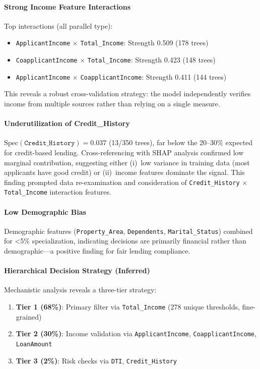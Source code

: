 \paragraph{Strong Income Feature Interactions}
Top interactions (all parallel type):
\begin{itemize}
    \item \texttt{ApplicantIncome} $\times$ \texttt{Total\_Income}: Strength 0.509 (178 trees)
    \item \texttt{CoapplicantIncome} $\times$ \texttt{Total\_Income}: Strength 0.423 (148 trees)
    \item \texttt{ApplicantIncome} $\times$ \texttt{CoapplicantIncome}: Strength 0.411 (144 trees)
\end{itemize}
This reveals a robust cross-validation strategy: the model independently verifies income from multiple sources rather than relying on a single measure.

\paragraph{Underutilization of Credit\_History}
$\text{Spec}(\texttt{Credit\_History}) = 0.037$ (13/350 trees), far below the 20--30\% expected for credit-based lending. Cross-referencing with SHAP analysis confirmed low marginal contribution, suggesting either (i)~low variance in training data (most applicants have good credit) or (ii)~income features dominate the signal. This finding prompted data re-examination and consideration of \texttt{Credit\_History} $\times$ \texttt{Total\_Income} interaction features.

\paragraph{Low Demographic Bias}
Demographic features (\texttt{Property\_Area}, \texttt{Dependents}, \texttt{Marital\_Status}) combined for <5\% specialization, indicating decisions are primarily financial rather than demographic---a positive finding for fair lending compliance.

\paragraph{Hierarchical Decision Strategy (Inferred)}
Mechanistic analysis reveals a three-tier strategy:
\begin{enumerate}
    \item \textbf{Tier 1 (68\%)}: Primary filter via \texttt{Total\_Income} (278 unique thresholds, fine-grained)
    \item \textbf{Tier 2 (30\%)}: Income validation via \texttt{ApplicantIncome}, \texttt{CoapplicantIncome}, \texttt{LoanAmount}
    \item \textbf{Tier 3 (2\%)}: Risk checks via \texttt{DTI}, \texttt{Credit\_History}
\end{enumerate}

